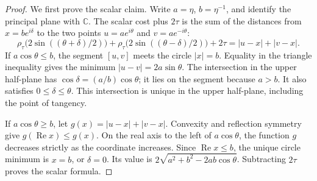 \begin{proof}
We first prove the scalar claim. Write $a=\eta$, $b=\eta^{-1}$, and
identify the principal plane with $\mathbb C$. The scalar cost plus
$2\tau$ is the sum of the distances from $x=be^{i\delta}$ to the two
points $u=ae^{i\theta}$ and $v=ae^{-i\theta}$:
\begin{equation}
 \rho_\tau\bigl(2\sin((\theta+\delta)/2)\bigr)
 +\rho_\tau\bigl(2\sin((\theta-\delta)/2)\bigr)+2\tau
 =|u-x|+|v-x|.
 \label{eq:smoothed-ellipse}
\end{equation}
If $a\cos\theta\leq b$, the segment $[u,v]$ meets the circle
$|x|=b$. Equality in the triangle inequality gives the minimum
$|u-v|=2a\sin\theta$. The intersection in the upper half-plane has
$\cos\delta=(a/b)\cos\theta$; it lies on the segment because $a>b$.
It also satisfies $0\leq\delta\leq\theta$. This intersection is unique
in the upper half-plane, including the point of tangency.

If $a\cos\theta\geq b$, let $g(x)=|u-x|+|v-x|$. Convexity and
reflection symmetry give $g(\operatorname{Re}x)\leq g(x)$. On the real
axis to the left of $a\cos\theta$, the function $g$ decreases strictly
as the coordinate increases. Since $\operatorname{Re}x\leq b$, the
unique circle minimum is $x=b$, or $\delta=0$. Its value is
$2\sqrt{a^2+b^2-2ab\cos\theta}$. Subtracting $2\tau$ proves the
scalar formula.


\end{proof}
